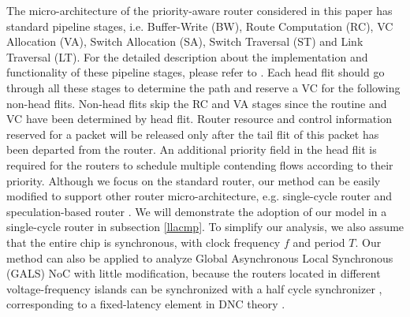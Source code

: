 \documentclass[preprint]{elsarticle}
\begin{document}
The micro-architecture of the priority-aware router considered in this paper has standard pipeline stages, i.e. Buffer-Write (BW), Route Computation (RC), VC Allocation (VA), Switch Allocation (SA), Switch Traversal (ST) and Link Traversal (LT). For the detailed description about the implementation and functionality of these pipeline stages, please refer to \cite{jerger2009chip}. Each head flit should go through all these stages to determine the path and reserve a VC for the following non-head flits. Non-head flits skip the RC and VA stages since the routine and VC have been determined by head flit. Router resource and control information reserved for a packet will be released only after the tail flit of this packet has been departed from the router. An additional priority field in the head flit is required for the routers to schedule multiple contending flows according to their priority. Although we focus on the standard router, our method can be easily modified to support other router micro-architecture, e.g. single-cycle router \cite{627905}\cite{Shi:2008:RCA:1397757.1397996}\cite{707545}\cite{73} and speculation-based router \cite{jerger2009chip}. We will demonstrate the adoption of our model in a single-cycle router in subsection \ref{llacmp}.  To simplify our analysis, we also assume that the entire chip is synchronous, with clock frequency $f$ and period $T$. Our method can also be applied to analyze Global Asynchronous Local Synchronous (GALS) NoC with little modification, because the routers located in different voltage-frequency islands can be synchronized with a half cycle synchronizer \cite{5476986}, corresponding to a fixed-latency element in DNC theory \cite{Boudec2001Network}.
\end{document}
